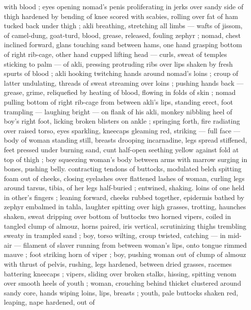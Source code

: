 with blood ; eyes opening {\col} nomad's penis proliferating in jerks over 
sandy side of thigh hardened by bending of knee scored with 
scabies, rolling over fat of ham tucked back under thigh ; akli 
breathing, stretching all limbs --- wafts of jissom, of camel-dung, 
goat-turd, blood, grease, released, fouling zephyr ; nomad, chest 
inclined forward, glans touching sand between hams, one hand 
grasping bottom of right rib-cage, other hand cupped lifting head --- 
curls, sweat of temples sticking to palm --- of akli, pressing 
protruding ribs over lips shaken by fresh spurts of blood ; akli 
hooking twitching hands around nomad's loins ; croup of latter 
undulating, threads of sweat streaming over loins ; pushing hands 
back --- grease, grime, reliquefied by heating of blood, flowing in 
folds of skin ; nomad pulling bottom of right rib-cage from between 
akli's lips, standing erect, foot trampling --- laughing bright --- on 
flank of his akli, monkey nibbling heel of boy's right foot, licking 
broken blisters on ankle ; springing forth, fire radiating over raised 
torso, eyes sparkling, kneecaps gleaming red, striking --- full face 
--- body of woman standing still, breasts drooping incarnadine, legs 
spread stiffened, feet pressed under burning sand, cunt half-open 
seething yellow against fold at top of thigh ; boy squeezing woman's 
body between arms with marrow surging in bones, pushing belly. 
contracting tendons of buttocks, modulated belch spitting foam out 
of cheeks, closing eyelashes over flattened lashes of woman, curling 
legs around tarsus, tibia, of her legs half-buried ; entwined, shaking. 
loins of one held in other's fingers ; leaning forward, cheeks rubbed 
together, epidermis bathed by zephyr embalmed in tahla, laughter 
spitting over high grasses, trotting, haunches shaken, sweat dripping 
over bottom of buttocks {\col} two horned vipers, coiled in tangled clump 
of almouz, horns paired, iris vertical, scrutinizing thighs trembling 
sweaty in trampled sand ; boy, torso wilting, croup twisted, catching 
--- in mid-air --- filament of slaver running from between woman's 
lips, onto tongue rimmed mauve ; foot striking horn of viper ; boy,
pushing woman out of clump of almouz with thrust of pelvis,
rushing, legs hardened, between dried grasses, racemes battering 
kneecaps ; vipers, sliding over broken stalks, hissing, spitting venom 
over smooth heels of youth ; woman, crouching behind thicket 
clustered around sandy core, hands wiping loins, lips, breasts ; 
youth, pale buttocks shaken red, leaping, nape hardened, out of 
